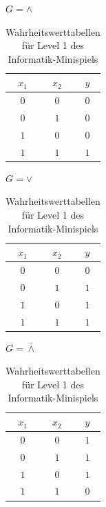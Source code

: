 \begin{table}[H]
    \centering
    \begin{minipage}{.33\textwidth}
        $G = \land$\\
        \vfill
        \begin{tabular}{|c|c|c|} 
            \hline
            $x_1$ & $x_2$ & $y$ \\
            \hline\hline
            $0$ & $0$ & $0$ \\
            $0$ & $1$ & $0$ \\
            $1$ & $0$ & $0$ \\
            $1$ & $1$ & $1$ \\
            \hline
        \end{tabular}
    \end{minipage}
    \hfill
    \begin{minipage}{.32\textwidth}
        $G = \lor$\\
        \vfill
        \begin{tabular}{|c|c|c|} 
            \hline
            $x_1$ & $x_2$ & $y$ \\
            \hline\hline
            $0$ & $0$ & $0$ \\
            $0$ & $1$ & $1$ \\
            $1$ & $0$ & $1$ \\
            $1$ & $1$ & $1$ \\
            \hline
        \end{tabular}
    \end{minipage}
    \hfill
    \begin{minipage}{.33\textwidth}
        $G = \overline{\land}$\\
        \vfill
        \begin{tabular}{|c|c|c|} 
            \hline
            $x_1$ & $x_2$ & $y$ \\
            \hline\hline
            $0$ & $0$ & $1$ \\
            $0$ & $1$ & $1$ \\
            $1$ & $0$ & $1$ \\
            $1$ & $1$ & $0$ \\
            \hline
        \end{tabular}
    \end{minipage}
    \caption{Wahrheitswerttabellen für Level 1 des Informatik-Minispiels}
    \label{tab:wwt01}
\end{table}

